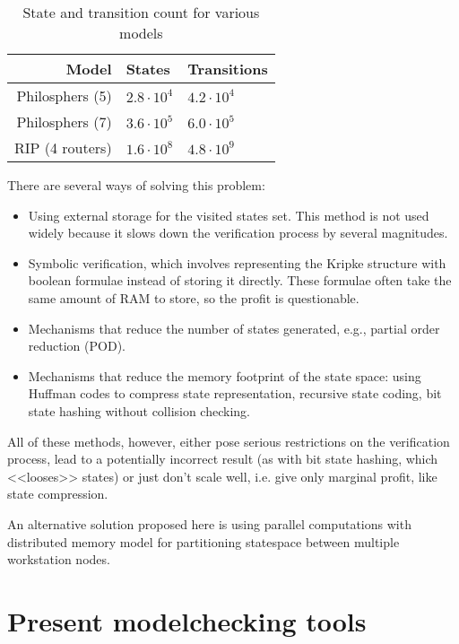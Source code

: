 \documentclass[a4paper,notitlepage,14pt]{article}
\begin{document}
\begin{table}
  \centering
  \begin{tabular}{|r|l|l|}
    \hline
    Model                  & States         & Transitions       \\
    \hline
    Philosphers (5)            & $2.8 \cdot 10^4$  & $4.2 \cdot 10^4$ \\
    Philosphers (7)            & $3.6 \cdot 10^5$  & $6.0 \cdot 10^5$ \\
    RIP (4 routers)  & $1.6 \cdot 10^8$  & $4.8 \cdot 10^9$ \\
    \hline
  \end{tabular}
  \caption{State and transition count for various models}
  \label{tab:models-statecount}
\end{table}

There are several ways of solving this problem:
\begin{itemize}
\item Using external storage for the visited states set. This method is not used widely
  because it slows down the verification process by several magnitudes.
\item Symbolic verification, which involves representing the Kripke structure with boolean
  formulae instead of storing it directly. These formulae often take the same amount of
  RAM to store, so the profit is questionable.
\item Mechanisms that reduce the number of states generated, e.g., partial order reduction
  (POD).
\item Mechanisms that reduce the memory footprint of the state space: using Huffman codes
  to compress state representation, recursive state coding, bit state hashing without
  collision checking.
\end{itemize}

All of these methods, however, either pose serious restrictions on the verification process,
lead to a potentially incorrect result (as with bit state hashing, which <<looses>> states)
or just don't scale well, i.e. give only marginal profit, like state compression.

An alternative solution proposed here is using parallel computations with distributed memory
model for partitioning statespace between multiple workstation nodes.

\section{Present modelchecking tools}
\label{sec:pres-modelch-tools}
\end{document}
